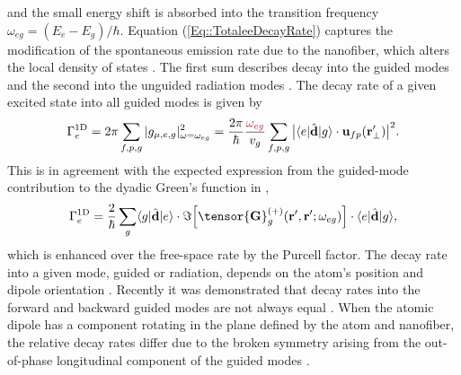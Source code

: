 \documentclass[preprint,aps,pra,onecolumn]{revtex4-1} %
\newcommand{\oneD}{{\rm 1D}}
\newcommand{\comment}[1]{{\color{Maroon} #1}}
\begin{document}
and the small energy shift is absorbed into the transition frequency $\omega_{eg} = (E_e - E_g)/\hbar$.  Equation (\ref{Eq::TotaleeDecayRate}) captures the modification of the spontaneous emission rate due to the nanofiber, which alters the local density of states \cite{le_kien_spontaneous_2005}.  The first sum describes decay into the guided modes and the second into the unguided radiation modes \cite{ nha_cavity_1997,klimov_spontaneous_2004,le_kien_spontaneous_2005,maslov_distribution_2006}. The decay rate of a given excited state into all guided modes is given by
	\begin{equation}
		\Gamma_e^{\oneD}= 2\pi \sum_{f,p,g} |g_{\mu,e,g} |^2_{\omega = \omega_{eg}} =  \frac{ 2\pi }{\hbar} \frac{ \comment{\omega_{eg}} }{v_g} \sum_{f,p,g} \big|\bra{e}\hat{\mathbf{d}}\ket{g} \cdot \mathbf{u}_{fp}(\br'_\perp)\big|^2  .
	\end{equation}
This is in agreement with the expected expression from the guided-mode contribution to the dyadic Green's function in ,
	\begin{equation}
		\Gamma_e^{\oneD} =  \frac{2}{\hbar} \sum_{g}  \bra{g}\hat{\mathbf{d}}\ket{e}\cdot 
\Im \Big[\tensor{\mathbf{G}}^{(+)}_g(\br', \br'; \omega_{eg} ) \Big] \cdot \bra{e}\hat{\mathbf{d}}\ket{g},
	\end{equation}
which is enhanced over the free-space rate by the Purcell factor. The decay rate into a given mode, guided or radiation, depends on the atom's position and dipole orientation \cite{klimov_spontaneous_2004, vos_orientation-dependent_2009}. Recently it was demonstrated that decay rates into the forward and backward guided modes are not always equal \cite{mitsch_quantum_2014}. When the atomic dipole has a component rotating in the plane defined by the atom and nanofiber, the relative decay rates differ due to the broken symmetry arising from the out-of-phase longitudinal component of the guided modes \cite{le_kien_anisotropy_2014}. 
\end{document}
